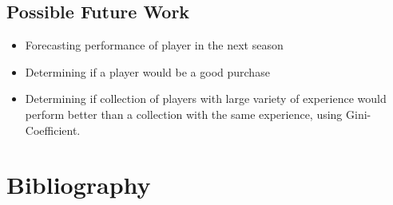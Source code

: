 \documentclass[
  english,
  doc,floatsintext]{apa6}
\providecommand{\tightlist}{%
  \setlength{\itemsep}{0pt}\setlength{\parskip}{0pt}}
\begin{document}
\hypertarget{possible-future-work}{%
\subsection{Possible Future Work}\label{possible-future-work}}

\begin{itemize}
\tightlist
\item
  Forecasting performance of player in the next season
\item
  Determining if a player would be a good purchase
\item
  Determining if collection of players with large variety of experience would perform better than a collection with the same experience, using Gini-Coefficient.
\end{itemize}

\newpage

\hypertarget{bibliography}{%
\section{Bibliography}\label{bibliography}}
\end{document}
